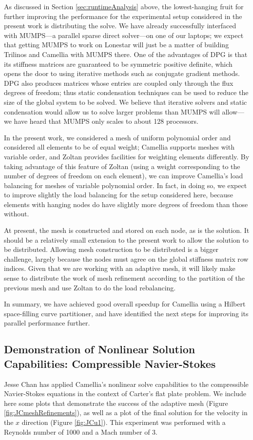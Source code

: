 As discussed in Section \ref{sec:runtimeAnalysis} above, the lowest-hanging fruit for further improving the performance for the experimental setup considered in the present work is distributing the solve.  We have already successfully interfaced with MUMPS---a parallel sparse direct solver---on one of our laptops; we expect that getting MUMPS to work on Lonestar will just be a matter of building Trilinos and Camellia with MUMPS there.  One of the advantages of DPG is that its stiffness matrices are guaranteed to be symmetric positive definite, which opens the door to using iterative methods such as conjugate gradient methods.  DPG also produces matrices whose entries are coupled only through the flux degrees of freedom; thus static condensation techniques can be used to reduce the size of the global system to be solved.  We believe that iterative solvers and static condensation would allow us to solve larger problems than MUMPS will allow---we have heard that MUMPS only scales to about 128 processors.

In the present work, we considered a mesh of uniform polynomial order and considered all elements to be of equal weight; Camellia supports meshes with variable order, and Zoltan provides facilities for weighting elements differently.  By taking advantage of this feature of Zoltan (using a weight corresponding to the number of degrees of freedom on each element), we can improve Camellia's load balancing for meshes of variable polynomial order.  In fact, in doing so, we expect to improve slightly the load balancing for the setup considered here, because elements with hanging nodes do have slightly more degrees of freedom than those without.

At present, the mesh is constructed and stored on each node, as is the solution.  It should be a relatively small extension to the present work to allow the solution to be distributed.  Allowing mesh construction to be distributed is a bigger challenge, largely because the nodes must agree on the global stiffness matrix row indices.  Given that we are working with an adaptive mesh, it will likely make sense to distribute the work of mesh refinement according to the partition of the previous mesh and use Zoltan to do the load rebalancing.

In summary, we have achieved good overall speedup for Camellia using a Hilbert space-filling curve partitioner, and have identified the next steps for improving its parallel performance further.

\subsection{Demonstration of Nonlinear Solution Capabilities: Compressible Navier-Stokes}\label{sec:compressibleNS}
Jesse Chan has applied Camellia's nonlinear solve capabilities to the compressible Navier-Stokes equations in the context of Carter's flat plate problem.  We include here some plots that demonstrate the success of the adaptive mesh (Figure \ref{fig:JCmeshRefinements}), as well as a plot of the final solution for the velocity in the $x$ direction (Figure \ref{fig:JCu1}).  This experiment was performed with a Reynolds number of 1000 and a Mach number of 3.

